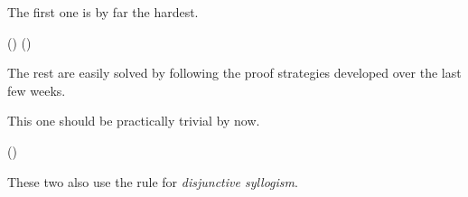 The first one is by far the hardest.

\begin{table}[h]
  \centering
  \begin{fitchproof}
     {\enot(\ephi\eand\epsi)}           
    \open
     {\enot(\enot\ephi\eor\enot\epsi)}  
    \open
     {\enot\ephi}                       
     {\enot\ephi\eor\enot\psi}          
     {\ebot}                            
    \close
     {\ephi}                            
    \open
     {\enot\epsi}                       
     {\enot\ephi\eor\enot\psi}          
     {\ebot}                            
    \close
                                
                      
                                
    \close
             
  \end{fitchproof}
  \caption{Proof of $\enot(\ephi\eand\epsi)\eproves(\enot\ephi\eor\enot\epsi)$}
\end{table}

The rest are easily solved by following the proof strategies developed over the
last few weeks.

\newpage

This one should be practically trivial by now.

\begin{table}[h]
  \centering
  \begin{fitchproof}
     {\enot(\ephi\eor\epsi)}     
    \open
     {\ephi}                     
     {\ephi\eor\epsi}            
     {\ebot}                     
    \close
     {\enot\ephi}                
    \open
     {\epsi}                     
     {\ephi\eor\epsi}            
     {\ebot}                     
    \close
     {\enot\epsi}                    
     
  \end{fitchproof}  
  \caption{Proof of $\enot(\ephi\eor\epsi)\eproves(\enot\ephi\eand\enot\epsi)$}
\end{table}

\newpage

These two also use the rule for \emph{disjunctive syllogism}.

